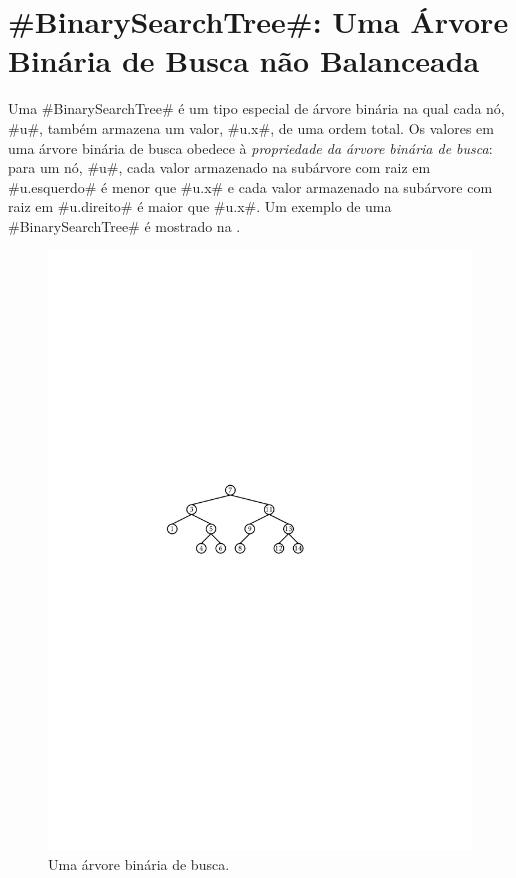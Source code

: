 \section{#BinarySearchTree#: Uma Árvore Binária de Busca não Balanceada}

%
%
%
Uma #BinarySearchTree# é um tipo especial de árvore binária na qual cada nó, #u#,
também armazena um valor, #u.x#, de uma ordem total.  Os valores em uma árvore binária de busca obedece à \emph{propriedade da árvore binária de busca}:
%
para um nó, #u#, cada valor armazenado na subárvore com raiz em #u.esquerdo# é menor que #u.x# e cada valor armazenado na subárvore com raiz em
#u.direito# é maior que #u.x#.  Um exemplo de uma #BinarySearchTree# é mostrado na .

\begin{figure}
  \begin{center}
    \includegraphics[scale=0.90909]{figs/bst-example}
  \end{center}
  \caption{Uma árvore binária de busca.}
\end{figure}



